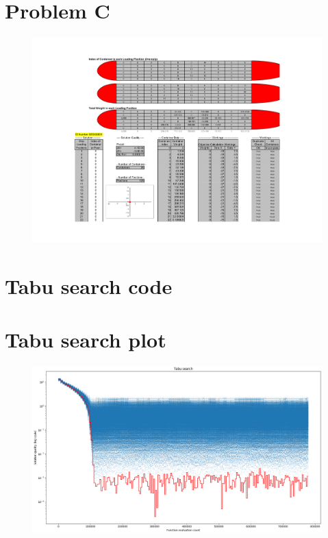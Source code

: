 \documentclass[10pt,a4paper]{article}
\begin{document}
\newpage
\thispagestyle{plain}
\section*{Problem C}
\begin{figure}[H]
	\centering
	\includegraphics[width=1.6\linewidth, angle=90, origin=c]{ProbC.pdf}
\end{figure}

\newpage
\section*{Tabu search code}

\newpage
\thispagestyle{plain}
\section*{Tabu search plot}
\begin{figure}[H]
	\centering
	\includegraphics[width=1.4\linewidth, angle=90, origin=c]{tabu_search}
\end{figure}
\newpage
\thispagestyle{plain}
\end{document}

